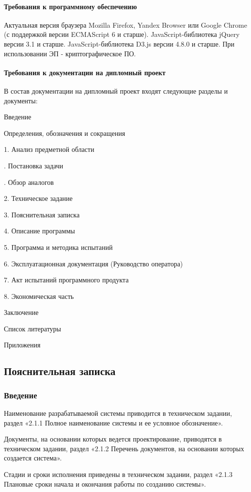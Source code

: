 \documentclass[a4paper]{extarticle}
\begin{document}
\paragraph{Требования к программному обеспечению}
Актуальная версия браузера Mozilla Firefox, Yandex Browser или Google Chrome (с поддержкой версии ECMAScript 6 и старше). JavaScript-библиотека jQuery версии 3.1 и старше. JavaScript-библиотека D3.js версии 4.8.0 и старше. При использовании ЭП - криптографическое ПО.

\paragraph{Требования к документации на дипломный проект}
В состав документации на дипломный проект входят следующие разделы и документы:\par
Введение\par
\qquad Определения, обозначения и сокращения\par
1.	Анализ предметной области\par
{}.	Постановка задачи\par
{}.	Обзор аналогов\par
2.	Техническое задание\par
3.	Пояснительная записка\par
4.	Описание программы\par
5.	Программа и методика испытаний\par
6.	Эксплуатационная документация (Руководство оператора)\par
7.	Акт испытаний программного продукта\par
8.	Экономическая часть\par
Заключение\par
Список литературы\par
Приложения\par

\subsection{Пояснительная записка}

\subsubsection*{Введение}
Наименование разрабатываемой системы приводится в техническом задании, раздел «2.1.1 Полное наименование системы и ее условное обозначение».\par
Документы, на основании которых ведется проектирование, приводятся в техническом задании, раздел «2.1.2 Перечень документов, на основании которых создается система».\par
Стадии и сроки исполнения приведены в техническом задании, раздел «2.1.3 Плановые сроки начала и окончания работы по созданию системы».
\end{document}
